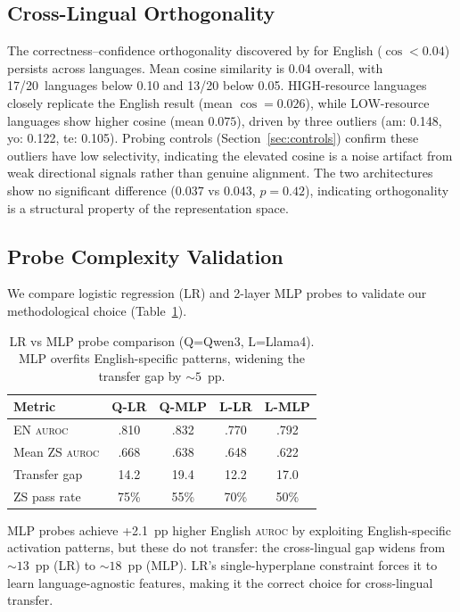 \documentclass[11pt,a4paper]{article}
\newcommand{\aur}{\textsc{auroc}}
\begin{document}
\subsection{Cross-Lingual Orthogonality}
\label{sec:orthogonality}

The correctness--confidence orthogonality discovered by \citet{miao2026closing} for English ($\cos < 0.04$) persists across languages. Mean cosine similarity is 0.04 overall, with 17/20~languages below 0.10 and 13/20 below 0.05. HIGH-resource languages closely replicate the English result (mean $\cos = 0.026$), while LOW-resource languages show higher cosine (mean $0.075$), driven by three outliers (am: 0.148, yo: 0.122, te: 0.105). Probing controls (Section~\ref{sec:controls}) confirm these outliers have low selectivity, indicating the elevated cosine is a noise artifact from weak directional signals rather than genuine alignment. The two architectures show no significant difference ($0.037$ vs $0.043$, $p=0.42$), indicating orthogonality is a structural property of the representation space.

\subsection{Probe Complexity Validation}
\label{sec:probe_complexity}

We compare logistic regression (LR) and 2-layer MLP probes to validate our methodological choice (Table~\ref{tab:lr_mlp}).

\begin{table}[t]
\centering
\small
\begin{tabular}{lcccc}
\toprule
\textbf{Metric} & \textbf{Q-LR} & \textbf{Q-MLP} & \textbf{L-LR} & \textbf{L-MLP} \\
\midrule
EN \aur{} & .810 & .832 & .770 & .792 \\
Mean ZS \aur{} & .668 & .638 & .648 & .622 \\
Transfer gap & 14.2 & 19.4 & 12.2 & 17.0 \\
ZS pass rate & 75\% & 55\% & 70\% & 50\% \\
\bottomrule
\end{tabular}
\caption{LR vs MLP probe comparison (Q=Qwen3, L=Llama4). MLP overfits English-specific patterns, widening the transfer gap by ${\sim}5$~pp.}
\label{tab:lr_mlp}
\end{table}

MLP probes achieve +2.1~pp higher English \aur{} by exploiting English-specific activation patterns, but these do not transfer: the cross-lingual gap widens from ${\sim}13$~pp (LR) to ${\sim}18$~pp (MLP). LR's single-hyperplane constraint forces it to learn language-agnostic features, making it the correct choice for cross-lingual transfer.
\end{document}
